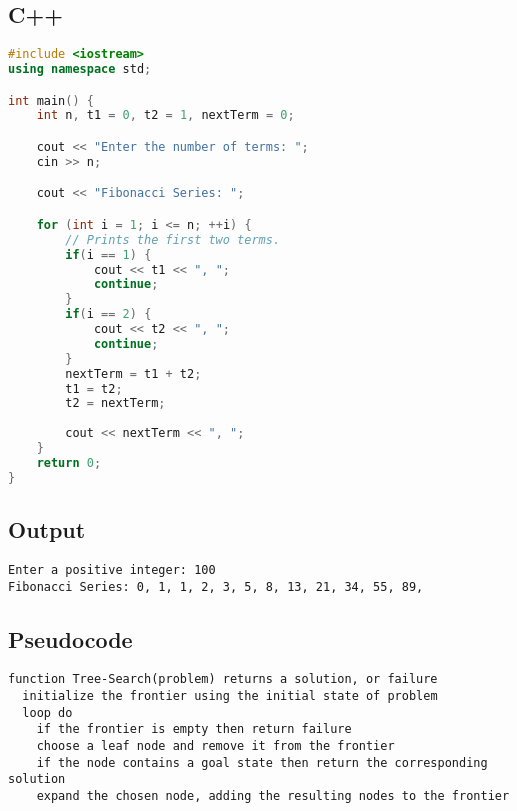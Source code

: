\documentclass[10pt]{article}
\begin{document}
\subsection{C++}

\begin{lstlisting}[language=c++]
#include <iostream>
using namespace std;

int main() {
    int n, t1 = 0, t2 = 1, nextTerm = 0;

    cout << "Enter the number of terms: ";
    cin >> n;

    cout << "Fibonacci Series: ";

    for (int i = 1; i <= n; ++i) {
        // Prints the first two terms.
        if(i == 1) {
            cout << t1 << ", ";
            continue;
        }
        if(i == 2) {
            cout << t2 << ", ";
            continue;
        }
        nextTerm = t1 + t2;
        t1 = t2;
        t2 = nextTerm;
        
        cout << nextTerm << ", ";
    }
    return 0;
}
\end{lstlisting}

\subsection{Output}

\begin{lstlisting}[style=lstoutput]
Enter a positive integer: 100
Fibonacci Series: 0, 1, 1, 2, 3, 5, 8, 13, 21, 34, 55, 89, 
\end{lstlisting}

\subsection{Pseudocode}

\begin{lstlisting}[language=pseudo]
function Tree-Search(problem) returns a solution, or failure
  initialize the frontier using the initial state of problem
  loop do
    if the frontier is empty then return failure
    choose a leaf node and remove it from the frontier
    if the node contains a goal state then return the corresponding solution
    expand the chosen node, adding the resulting nodes to the frontier
\end{lstlisting}
\end{document}
